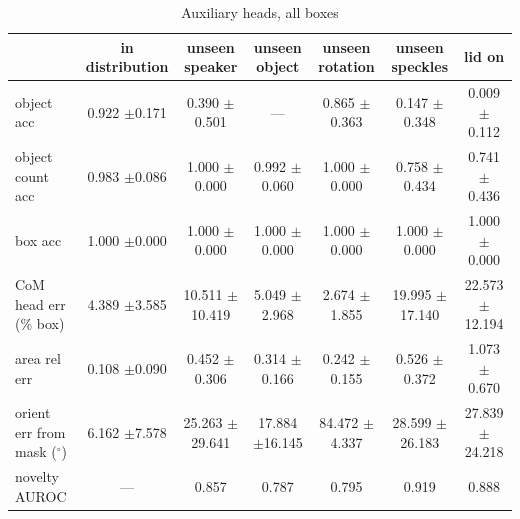 \begin{table}
\caption{Auxiliary heads, all boxes}
\label{tab:aux_heads}
\begin{tabular}{l!{\vrule width 1.2pt}cccccc}
\toprule
 & in distribution & unseen speaker & unseen object & unseen rotation & unseen speckles & lid on \\
\midrule
object acc & 0.922 {\scriptsize $\pm$0.171} & 0.390 {\scriptsize $\pm$0.501} & — & 0.865 {\scriptsize $\pm$0.363} & 0.147 {\scriptsize $\pm$0.348} & 0.009 {\scriptsize $\pm$0.112} \\
object count acc & 0.983 {\scriptsize $\pm$0.086} & 1.000 {\scriptsize $\pm$0.000} & 0.992 {\scriptsize $\pm$0.060} & 1.000 {\scriptsize $\pm$0.000} & 0.758 {\scriptsize $\pm$0.434} & 0.741 {\scriptsize $\pm$0.436} \\
box acc & 1.000 {\scriptsize $\pm$0.000} & 1.000 {\scriptsize $\pm$0.000} & 1.000 {\scriptsize $\pm$0.000} & 1.000 {\scriptsize $\pm$0.000} & 1.000 {\scriptsize $\pm$0.000} & 1.000 {\scriptsize $\pm$0.000} \\
CoM head err (\% box) & 4.389 {\scriptsize $\pm$3.585} & 10.511 {\scriptsize $\pm$10.419} & 5.049 {\scriptsize $\pm$2.968} & 2.674 {\scriptsize $\pm$1.855} & 19.995 {\scriptsize $\pm$17.140} & 22.573 {\scriptsize $\pm$12.194} \\
area rel err & 0.108 {\scriptsize $\pm$0.090} & 0.452 {\scriptsize $\pm$0.306} & 0.314 {\scriptsize $\pm$0.166} & 0.242 {\scriptsize $\pm$0.155} & 0.526 {\scriptsize $\pm$0.372} & 1.073 {\scriptsize $\pm$0.670} \\
orient err from mask ($^\circ$) & 6.162 {\scriptsize $\pm$7.578} & 25.263 {\scriptsize $\pm$29.641} & 17.884 {\scriptsize $\pm$16.145} & 84.472 {\scriptsize $\pm$4.337} & 28.599 {\scriptsize $\pm$26.183} & 27.839 {\scriptsize $\pm$24.218} \\
novelty AUROC & — & 0.857 & 0.787 & 0.795 & 0.919 & 0.888 \\
\bottomrule
\end{tabular}
\end{table}
